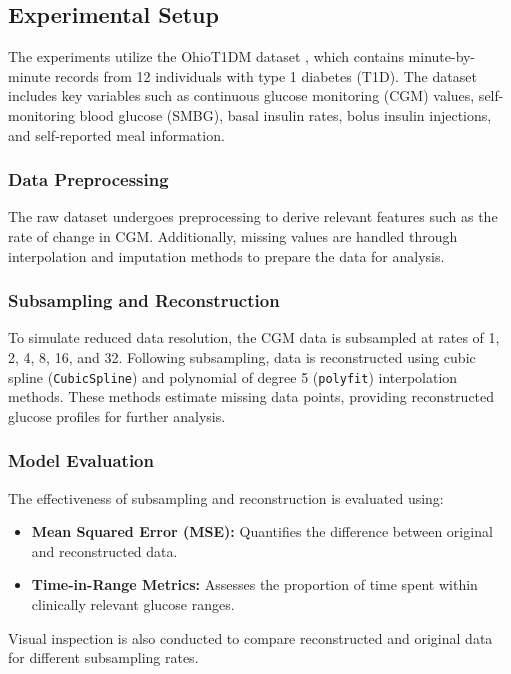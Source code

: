 \subsection{Experimental Setup}

The experiments utilize the OhioT1DM dataset \cite{ohioT1DM_dataset}, which contains minute-by-minute records from 12 individuals with type 1 diabetes (T1D). The dataset includes key variables such as continuous glucose monitoring (CGM) values, self-monitoring blood glucose (SMBG), basal insulin rates, bolus insulin injections, and self-reported meal information.

\subsubsection{Data Preprocessing}
The raw dataset undergoes preprocessing to derive relevant features such as the rate of change in CGM. Additionally, missing values are handled through interpolation and imputation methods to prepare the data for analysis.

\subsubsection{Subsampling and Reconstruction}
To simulate reduced data resolution, the CGM data is subsampled at rates of 1, 2, 4, 8, 16, and 32. Following subsampling, data is reconstructed using cubic spline (\texttt{CubicSpline}) and polynomial of degree 5 (\texttt{polyfit}) interpolation methods. These methods estimate missing data points, providing reconstructed glucose profiles for further analysis.

\subsubsection{Model Evaluation}
The effectiveness of subsampling and reconstruction is evaluated using:
\begin{itemize}
	\item \textbf{Mean Squared Error (MSE):} Quantifies the difference between original and reconstructed data.
	\item \textbf{Time-in-Range Metrics:} Assesses the proportion of time spent within clinically relevant glucose ranges.
\end{itemize}
Visual inspection is also conducted to compare reconstructed and original data for different subsampling rates.


















